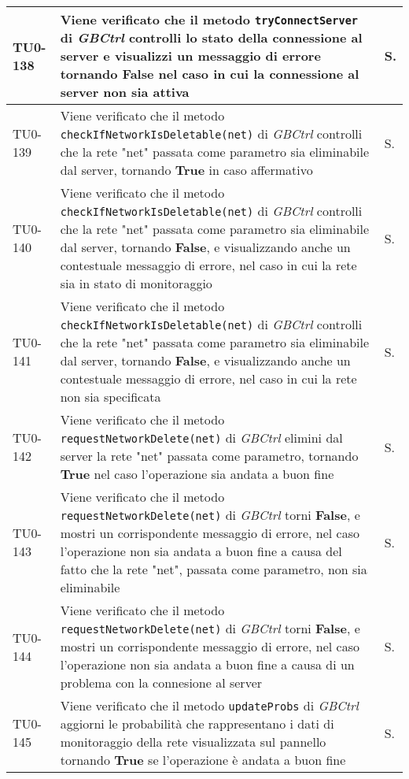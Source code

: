 \begin{longtable}{|C{.15\textwidth}|m{.66\textwidth}|C{.10\textwidth}|}
\hline
TU0-138 & Viene verificato che il metodo \texttt{tryConnectServer} di \textit{GBCtrl} controlli lo stato della connessione al server e visualizzi un messaggio di errore tornando \textbf{False} nel caso in cui la connessione al server non sia attiva & S.\\
\hline
{}TU0-139 & Viene verificato che il metodo \texttt{checkIfNetworkIsDeletable(net)} di \textit{GBCtrl} controlli che la rete "net" passata come parametro sia eliminabile dal server, tornando \textbf{True} in caso affermativo & S.\\
\hline
TU0-140 & Viene verificato che il metodo \texttt{checkIfNetworkIsDeletable(net)} di \textit{GBCtrl} controlli che la rete "net" passata come parametro sia eliminabile dal server, tornando \textbf{False}, e visualizzando anche un contestuale messaggio di errore, nel caso in cui la rete sia in stato di monitoraggio & S.\\
\hline
{}TU0-141 & Viene verificato che il metodo \texttt{checkIfNetworkIsDeletable(net)} di \textit{GBCtrl} controlli che la rete "net" passata come parametro sia eliminabile dal server, tornando \textbf{False}, e visualizzando anche un contestuale messaggio di errore, nel caso in cui la rete non sia specificata & S.\\
\hline
TU0-142 & Viene verificato che il metodo \texttt{requestNetworkDelete(net)} di \textit{GBCtrl} elimini dal server la rete "net" passata come parametro, tornando \textbf{True} nel caso l'operazione sia andata a buon fine & S.\\
\hline
{}TU0-143 & Viene verificato che il metodo \texttt{requestNetworkDelete(net)} di \textit{GBCtrl} torni \textbf{False}, e mostri un corrispondente messaggio di errore, nel caso l'operazione non sia andata a buon fine a causa del fatto che la rete "net", passata come parametro, non sia eliminabile & S.\\
\hline
TU0-144 & Viene verificato che il metodo \texttt{requestNetworkDelete(net)} di \textit{GBCtrl} torni \textbf{False}, e mostri un corrispondente messaggio di errore, nel caso l'operazione non sia andata a buon fine a causa di un problema con la connesione al server & S.\\
\hline
{}TU0-145 & Viene verificato che il metodo \texttt{updateProbs} di \textit{GBCtrl} aggiorni le probabilità che rappresentano i dati di monitoraggio della rete visualizzata sul pannello tornando \textbf{True} se l'operazione è andata a buon fine & S.\\

\end{longtable}
